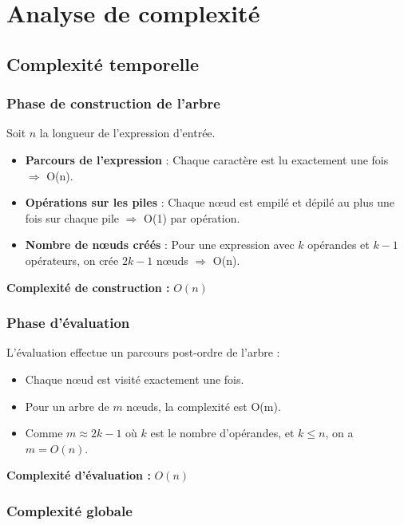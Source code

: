 \documentclass[12pt,a4paper]{article}
\begin{document}
\section{Analyse de complexité}

\subsection{Complexité temporelle}

\subsubsection{Phase de construction de l'arbre}

Soit $n$ la longueur de l'expression d'entrée.

\begin{itemize}
    \item \textbf{Parcours de l'expression} : Chaque caractère est lu exactement une fois $\Rightarrow$ O(n).
    \item \textbf{Opérations sur les piles} : Chaque nœud est empilé et dépilé au plus une fois sur chaque pile $\Rightarrow$ O(1) par opération.
    \item \textbf{Nombre de nœuds créés} : Pour une expression avec $k$ opérandes et $k-1$ opérateurs, on crée $2k-1$ nœuds $\Rightarrow$ O(n).
\end{itemize}

\textbf{Complexité de construction :} $O(n)$

\subsubsection{Phase d'évaluation}

L'évaluation effectue un parcours post-ordre de l'arbre :
\begin{itemize}
    \item Chaque nœud est visité exactement une fois.
    \item Pour un arbre de $m$ nœuds, la complexité est O(m).
    \item Comme $m \approx 2k - 1$ où $k$ est le nombre d'opérandes, et $k \leq n$, on a $m = O(n)$.
\end{itemize}

\textbf{Complexité d'évaluation :} $O(n)$

\subsubsection{Complexité globale}
\end{document}
